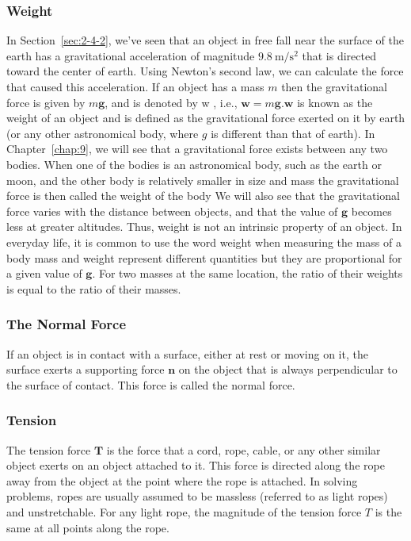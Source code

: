 \documentclass[10pt]{article}
\numberwithin{equation}{section}
\begin{document}
\subsubsection{Weight}\label{sec:3-3-1}
In Section~\ref{sec:2-4-2}, we've seen that an object in free fall near the surface of the earth has a gravitational acceleration of magnitude $9.8 \mathrm{~m} / \mathrm{s}^{2}$ that is directed toward the center of earth. Using Newton's second law, we can calculate the force that caused this acceleration. If an object has a mass $m$ then the gravitational force is given by $m \mathbf{g}$, and is denoted by w , i.e., $\mathbf{w}=m \mathbf{g} . \mathbf{w}$ is known as the weight of an object and is defined as the gravitational force exerted on it by earth (or any other astronomical body, where $g$ is different than that of earth). In Chapter~\ref{chap:9}, we will see that a gravitational force exists between any two bodies. When one of the bodies is an astronomical body, such as the earth or moon, and the other body is relatively smaller in size and mass the gravitational force is then called the weight of the body We will also see that the gravitational force varies with the distance between objects, and that the value of $\mathbf{g}$ becomes less at greater altitudes. Thus, weight is not an intrinsic property of an object. In everyday life, it is common to use the word weight when measuring the mass of a body mass and weight represent different quantities but they are proportional for a given value of $\mathbf{g}$. For two masses at the same location, the ratio of their weights is equal to the ratio of their masses.

\subsubsection{The Normal Force}\label{sec:3-3-2}
If an object is in contact with a surface, either at rest or moving on it, the surface exerts a supporting force $\mathbf{n}$ on the object that is always perpendicular to the surface of contact. This force is called the normal force.

\subsubsection{Tension}\label{sec:3-3-3}
The tension force $\mathbf{T}$ is the force that a cord, rope, cable, or any other similar object exerts on an object attached to it. This force is directed along the rope away from the object at the point where the rope is attached. In solving problems, ropes are usually assumed to be massless (referred to as light ropes) and unstretchable. For any light rope, the magnitude of the tension force $T$ is the same at all points along the rope.
\end{document}
